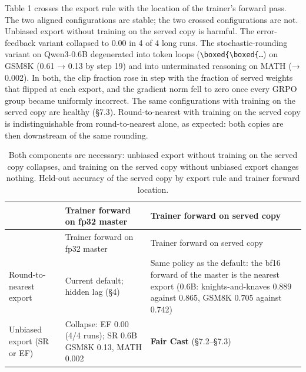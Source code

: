 \documentclass[
  10pt,
]{article}
\begin{document}
Table 1 crosses the export rule with the location of the trainer's forward pass. The two aligned
configurations are stable; the two crossed configurations are not. Unbiased export without training
on the served copy is harmful. The error-feedback variant collapsed to 0.00 in 4 of 4 long runs. The
stochastic-rounding variant on Qwen3-0.6B degenerated into token loops
(\texttt{\textbackslash{}boxed\{\textbackslash{}boxed\{…}) on GSM8K (0.61 → 0.13 by step 19) and
into unterminated reasoning on MATH (→ 0.002). In both, the clip fraction rose in step with the
fraction of served weights that flipped at each export, and the gradient norm fell to zero once
every GRPO group became uniformly incorrect. The same configurations with training on the served
copy are healthy (§7.3). Round-to-nearest with training on the served copy is indistinguishable from
round-to-nearest alone, as expected: both copies are then downstream of the same rounding.

\begin{longtable}[]{@{}
  >{\raggedright\arraybackslash}p{}
  >{\raggedright\arraybackslash}p{}
  >{\raggedright\arraybackslash}p{}@{}}
\caption{Both components are necessary: unbiased export without training on the served copy
collapses, and training on the served copy without unbiased export changes nothing. Held-out
accuracy of the served copy by export rule and trainer forward location.}\tabularnewline
\toprule\noalign{}
\begin{minipage}[b]{\linewidth}\raggedright
\end{minipage} & \begin{minipage}[b]{\linewidth}\raggedright
Trainer forward on fp32 master
\end{minipage} & \begin{minipage}[b]{\linewidth}\raggedright
Trainer forward on served copy
\end{minipage} \\
\midrule\noalign{}
\endfirsthead
\toprule\noalign{}
\begin{minipage}[b]{\linewidth}\raggedright
\end{minipage} & \begin{minipage}[b]{\linewidth}\raggedright
Trainer forward on fp32 master
\end{minipage} & \begin{minipage}[b]{\linewidth}\raggedright
Trainer forward on served copy
\end{minipage} \\
\midrule\noalign{}
\endhead
\bottomrule\noalign{}
\endlastfoot
Round-to-nearest export & Current default; hidden lag (§4) & Same policy as the default: the bf16
forward of the master is the nearest export (0.6B: knights-and-knaves 0.889 against 0.865, GSM8K
0.705 against 0.742) \\
Unbiased export (SR or EF) & Collapse: EF 0.00 (4/4 runs); SR 0.6B GSM8K 0.13, MATH 0.002 &
\textbf{Fair Cast} (§7.2--§7.3) \\
\end{longtable}
\end{document}
